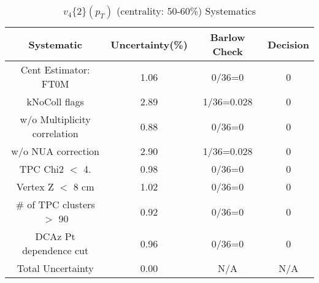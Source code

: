 \begin{table}[htbp]
\caption{$v_4\{2\}(p_{T})$ (centrality: 50-60\%) Systematics}
\label{tab:Sys_pTDiffv4}
\centering
\begin{tabular}{|c|c|c|c|}
\hline
Systematic & Uncertainty(\%) & Barlow Check & Decision \\
\hline
Cent Estimator: FT0M & 1.06 & 0/36=0 & 0 \\
kNoColl flags & 2.89 & 1/36=0.028 & 0 \\
w/o Multiplicity correlation & 0.88 & 0/36=0 & 0 \\
w/o NUA correction & 2.90 & 1/36=0.028 & 0 \\
TPC Chi2 $<$ 4. & 0.98 & 0/36=0 & 0 \\
Vertex Z $<$ 8 cm & 1.02 & 0/36=0 & 0 \\
\# of TPC clusters $>$ 90 & 0.92 & 0/36=0 & 0 \\
DCAz Pt dependence cut & 0.96 & 0/36=0 & 0 \\
\hline
Total Uncertainty & 0.00 & N/A & N/A \\
\hline
\end{tabular}
\end{table}
